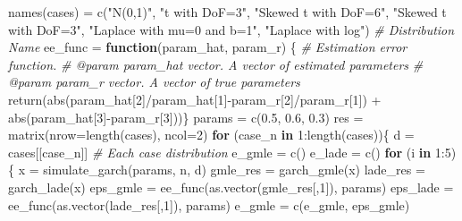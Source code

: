 \documentclass[
  11pt,
]{article}
\newenvironment{Shaded}{\begin{snugshade}}{\end{snugshade}}
\newcommand{\AttributeTok}[1]{\textcolor[rgb]{0.77,0.63,0.00}{#1}}
\newcommand{\CommentTok}[1]{\textcolor[rgb]{0.56,0.35,0.01}{\textit{#1}}}
\newcommand{\ControlFlowTok}[1]{\textcolor[rgb]{0.13,0.29,0.53}{\textbf{#1}}}
\newcommand{\DecValTok}[1]{\textcolor[rgb]{0.00,0.00,0.81}{#1}}
\newcommand{\FloatTok}[1]{\textcolor[rgb]{0.00,0.00,0.81}{#1}}
\newcommand{\FunctionTok}[1]{\textcolor[rgb]{0.00,0.00,0.00}{#1}}
\newcommand{\NormalTok}[1]{#1}
\newcommand{\OtherTok}[1]{\textcolor[rgb]{0.56,0.35,0.01}{#1}}
\newcommand{\SpecialCharTok}[1]{\textcolor[rgb]{0.00,0.00,0.00}{#1}}
\newcommand{\StringTok}[1]{\textcolor[rgb]{0.31,0.60,0.02}{#1}}
\begin{document}
\begin{Shaded}
\begin{Highlighting}[]
\FunctionTok{names}\NormalTok{(cases) }\OtherTok{=} \FunctionTok{c}\NormalTok{(}\StringTok{"N(0,1)"}\NormalTok{, }\StringTok{"t with DoF=3"}\NormalTok{, }\StringTok{"Skewed t with DoF=6"}\NormalTok{, }\StringTok{"Skewed t with DoF=3"}\NormalTok{, }\StringTok{"Laplace with mu=0 and b=1"}\NormalTok{, }\StringTok{"Laplace with log"}\NormalTok{) }\CommentTok{\# Distribution Name}
\NormalTok{ee\_func }\OtherTok{=} \ControlFlowTok{function}\NormalTok{(param\_hat, param\_r) \{}
  \CommentTok{\#\textquotesingle{} Estimation error function.}
  \CommentTok{\#\textquotesingle{} @param param\_hat vector. A vector of estimated parameters}
  \CommentTok{\#\textquotesingle{} @param param\_r vector. A vector of true parameters}
  \FunctionTok{return}\NormalTok{(}\FunctionTok{abs}\NormalTok{(param\_hat[}\DecValTok{2}\NormalTok{]}\SpecialCharTok{/}\NormalTok{param\_hat[}\DecValTok{1}\NormalTok{]}\SpecialCharTok{{-}}\NormalTok{param\_r[}\DecValTok{2}\NormalTok{]}\SpecialCharTok{/}\NormalTok{param\_r[}\DecValTok{1}\NormalTok{]) }\SpecialCharTok{+} \FunctionTok{abs}\NormalTok{(param\_hat[}\DecValTok{3}\NormalTok{]}\SpecialCharTok{{-}}\NormalTok{param\_r[}\DecValTok{3}\NormalTok{]))\}}
\NormalTok{params }\OtherTok{=} \FunctionTok{c}\NormalTok{(}\FloatTok{0.5}\NormalTok{, }\FloatTok{0.6}\NormalTok{, }\FloatTok{0.3}\NormalTok{)}
\NormalTok{res }\OtherTok{=} \FunctionTok{matrix}\NormalTok{(}\AttributeTok{nrow=}\FunctionTok{length}\NormalTok{(cases), }\AttributeTok{ncol=}\DecValTok{2}\NormalTok{)}
\ControlFlowTok{for}\NormalTok{ (case\_n }\ControlFlowTok{in} \DecValTok{1}\SpecialCharTok{:}\FunctionTok{length}\NormalTok{(cases))\{}
\NormalTok{  d }\OtherTok{=}\NormalTok{ cases[[case\_n]] }\CommentTok{\# Each case distribution}
\NormalTok{  e\_gmle }\OtherTok{=} \FunctionTok{c}\NormalTok{()}
\NormalTok{  e\_lade }\OtherTok{=} \FunctionTok{c}\NormalTok{()}
  \ControlFlowTok{for}\NormalTok{ (i }\ControlFlowTok{in} \DecValTok{1}\SpecialCharTok{:}\DecValTok{5}\NormalTok{) \{}
\NormalTok{    x }\OtherTok{=} \FunctionTok{simulate\_garch}\NormalTok{(params, n, d)}
\NormalTok{    gmle\_res }\OtherTok{=} \FunctionTok{garch\_gmle}\NormalTok{(x)}
\NormalTok{    lade\_res }\OtherTok{=} \FunctionTok{garch\_lade}\NormalTok{(x)}
\NormalTok{    eps\_gmle }\OtherTok{=} \FunctionTok{ee\_func}\NormalTok{(}\FunctionTok{as.vector}\NormalTok{(gmle\_res[,}\DecValTok{1}\NormalTok{]), params)}
\NormalTok{    eps\_lade }\OtherTok{=} \FunctionTok{ee\_func}\NormalTok{(}\FunctionTok{as.vector}\NormalTok{(lade\_res[,}\DecValTok{1}\NormalTok{]), params)}
\NormalTok{    e\_gmle }\OtherTok{=} \FunctionTok{c}\NormalTok{(e\_gmle, eps\_gmle)}

\end{Highlighting}
\end{Shaded}
\end{document}
